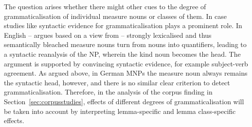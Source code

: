 \documentclass[USenglish]{article}
\begin{document}
The question arises whether there might other cues to the degree of grammaticalisation of individual measure nouns or classes of them.
In case studies like \cite{Brems2003,DeclerckBrems2016} syntactic evidence for grammaticalisation plays a prominent role.
In English -- \cite{Brems2003} argues based on a view from \cite{Langacker1991} -- strongly lexicalised and thus semantically bleached measure nouns turn from nouns into quantifiers, leading to a syntactic reanalysis of the NP, wherein the kind noun becomes the head.
The argument is supported by convincing syntactic evidence, for example subject-verb agreement.
As argued above, in German MNPs the measure noun always remains the syntactic head, however, and there is no similar clear criterion to detect grammaticalisation.
Therefore, in the analysis of the corpus finding in Section~\ref{sec:corpusstudies}, effects of different degrees of grammaticalisation will be taken into account by interpreting lemma-specific and lemma class-specific effects.
\end{document}
